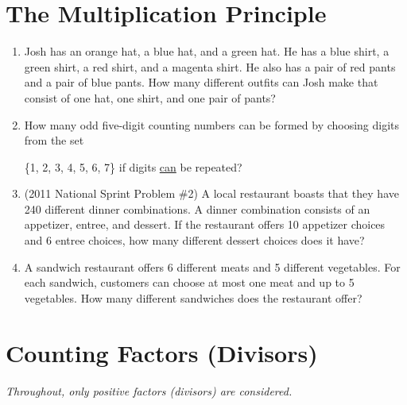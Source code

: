 \documentclass{article}
\begin{document}
\section*{The Multiplication Principle}

\begin{enumerate}
\item Josh has an orange hat, a blue hat, and a green hat. He has a blue shirt, a green shirt, a red shirt, and a magenta shirt. He also has a pair of red pants and a pair of blue pants. How many different outfits can Josh make that consist of one hat, one shirt, and one pair of pants?\vspace{3cm}
\item How many odd five-digit counting numbers can be formed by choosing digits from the set\par \{1, 2, 3, 4, 5, 6, 7\} if digits \underline{can} be repeated?\vspace{3cm}
\item (2011 National Sprint Problem \#2) A local restaurant boasts that they have 240 different dinner combinations. A dinner combination consists of an appetizer, entree, and dessert. If the restaurant offers 10 appetizer choices and 6 entree choices, how many different dessert choices does it have?\vspace{3cm}
\item A sandwich restaurant offers 6 different meats and 5 different vegetables. For each sandwich, customers can choose at most one meat and up to 5 vegetables. How many different sandwiches does the restaurant offer?
\end{enumerate}


\newpage

\section*{Counting Factors (Divisors)}

\textit{Throughout, only positive factors (divisors) are considered.}
\end{document}
